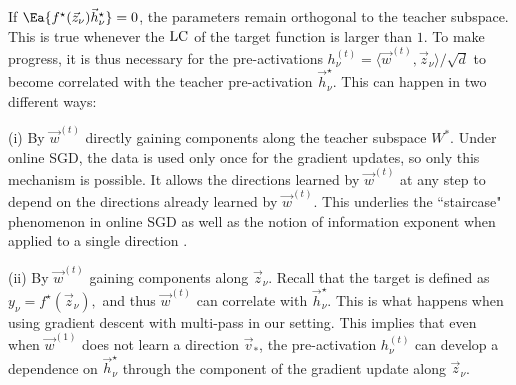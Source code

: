 If $\Ea{f^\star(\vec z_\nu)\vec{h}^\star_{\nu}}=0$, the parameters remain orthogonal to the teacher subspace. This is true whenever the $\rm LC$ of the target function is larger than $1$. To make progress, it is thus necessary for the pre-activations $h^{(t)}_\nu=\langle \vec w^{(t)}, \vec z_\nu \rangle / \sqrt{d}$ to become correlated with the teacher pre-activation $\vec{h}^\star_{\nu}$. This can happen in two different ways:
   
    (i) By $\vec{w}^{(t)}$ directly gaining components along the teacher subspace $W^*$. Under online SGD, the data is used only once for the gradient updates, so only this mechanism is possible. It allows the directions learned by $\vec{w}^{(t)}$ at any step to depend on the directions already learned by $\vec{w}^{(t)}$. This underlies the ``staircase" phenomenon in online SGD \citep{abbe2021staircase,abbe2022merged,abbe2023sgd} as well as the notion of information exponent when applied to a single direction \citep{arous2021online}.
    
    (ii) By $\vec{w}^{(t)}$ gaining components along $\vec{z}_\nu$. Recall that the target is defined as $y_\nu=f^{\star}(\vec{z}_\nu) ,$ and thus $\vec{w}^{(t)}$ can correlate with $\vec{h}^\star_{\nu}$. This is what happens when using gradient descent with multi-pass in our setting. This implies that even when $\vec w^{(1)}$ does not learn a direction $\vec{v}_*$, the pre-activation $h^{(t)}_\nu$ can develop a dependence on $\vec{h}^\star_{\nu}$ through the component of the gradient update along $\vec{z}_\nu$. 

